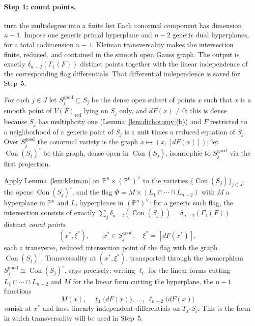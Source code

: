 \documentclass[acmsmall,screen,nonacm]{acmart}
\theoremstyle{definition}
\theoremstyle{remark}
\DeclareMathOperator{\Con}{Con}
\newcommand{\PP}{\mathbb{P}}
\newcommand{\pdeg}{\delta}
\newcommand{\Gone}{\Gamma_{\!1}}
\begin{document}
\paragraph{Step 1: count points.}
\begin{roadmapbox}{turn the multidegree into a finite list}
Each conormal component has dimension $n-1$.  Impose one generic primal
hyperplane and $n-2$ generic dual hyperplanes, for a total codimension
$n-1$.  Kleiman transversality makes the intersection finite, reduced, and
contained in the smooth open Gauss graph.  The output is exactly
$\pdeg_{n-2}(\Gone(F))$ distinct points together with the linear independence
of the corresponding flag differentials.  That differential independence is
saved for Step~5.
\end{roadmapbox}
For each $j\in J$ let $S_j^{\mathrm{good}}\subseteq S_j$ be the dense
open subset of points $x$ such that $x$ is a smooth point of
$V(F)_{\mathrm{red}}$ lying on $S_j$ only, and $dF(x)\ne0$; this is
dense because $S_j$ has multiplicity one
(Lemma~\ref{lem:dichotomy}(b)) and $F$ restricted to a neighborhood of
a generic point of $S_j$ is a unit times a reduced equation of $S_j$.
Over $S_j^{\mathrm{good}}$ the conormal variety is the graph
$x\mapsto(x,[dF(x)])$; let $\Con(S_j)^\circ$ be this graph, dense open
in $\Con(S_j)$, isomorphic to $S_j^{\mathrm{good}}$ via the first
projection.

Apply Lemma~\ref{lem:kleiman} on $\PP^n\times(\PP^n)^\vee$ to the
varieties $\{\Con(S_j)\}_{j\in J}$, the opens $\Con(S_j)^\circ$, and
the flag $\Phi=M\times(L_1\cap\cdots\cap L_{n-2})$ with $M$ a
hyperplane in $\PP^n$ and $L_t$ hyperplanes in $(\PP^n)^\vee$: for a
generic such flag, the intersection consists of exactly
$\sum_j\pdeg_{n-2}(\Con(S_j))=\pdeg_{n-2}(\Gone(F))$ distinct
\emph{count points}
\[
  (x^*,\xi^*),\qquad x^*\in S_j^{\mathrm{good}},\quad
  \xi^*=[dF(x^*)],
\]
each a transverse, reduced intersection point of the flag with the
graph $\Con(S_j)^\circ$.  Transversality at $(x^*,\xi^*)$, transported
through the isomorphism $S_j^{\mathrm{good}}\cong\Con(S_j)^\circ$,
says precisely: writing $\ell_t$ for the linear forms cutting
$L_1\cap\cdots\cap L_{n-2}$ and $M$ for the linear form cutting the
hyperplane, the $n-1$ functions
\begin{equation}\label{eq:flagfunctions}
  M(x),\quad \ell_1\big(dF(x)\big),\ \dots,\
  \ell_{n-2}\big(dF(x)\big)
\end{equation}
vanish at $x^*$ and have linearly independent differentials on
$T_{x^*}S_j$.  This is the form in which transversality will be used
in Step~5.
\end{document}

